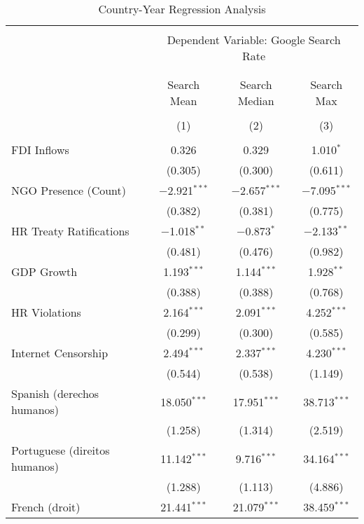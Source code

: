 
\begin{table}[!htbp] \centering 
  \caption{Country-Year Regression Analysis} 
  \label{} 
\begin{tabular}{@{\extracolsep{5pt}}lccc} 
\\[-1.8ex]\hline 
\hline \\[-1.8ex] 
 & \multicolumn{3}{c}{Dependent Variable: Google Search Rate} \\ 
\cline{2-4} 
\\[-1.8ex] & \multicolumn{3}{c}{ } \\ 
 & Search Mean & Search Median & Search Max \\ 
\\[-1.8ex] & (1) & (2) & (3)\\ 
\hline \\[-1.8ex] 
 FDI Inflows & 0.326 & 0.329 & 1.010$^{*}$ \\ 
  & (0.305) & (0.300) & (0.611) \\ 
  NGO Presence (Count) & $-$2.921$^{***}$ & $-$2.657$^{***}$ & $-$7.095$^{***}$ \\ 
  & (0.382) & (0.381) & (0.775) \\ 
  HR Treaty Ratifications & $-$1.018$^{**}$ & $-$0.873$^{*}$ & $-$2.133$^{**}$ \\ 
  & (0.481) & (0.476) & (0.982) \\ 
  GDP Growth & 1.193$^{***}$ & 1.144$^{***}$ & 1.928$^{**}$ \\ 
  & (0.388) & (0.388) & (0.768) \\ 
  HR Violations & 2.164$^{***}$ & 2.091$^{***}$ & 4.252$^{***}$ \\ 
  & (0.299) & (0.300) & (0.585) \\ 
  Internet Censorship & 2.494$^{***}$ & 2.337$^{***}$ & 4.230$^{***}$ \\ 
  & (0.544) & (0.538) & (1.149) \\ 
  Spanish (derechos humanos) & 18.050$^{***}$ & 17.951$^{***}$ & 38.713$^{***}$ \\ 
  & (1.258) & (1.314) & (2.519) \\ 
  Portuguese (direitos humanos) & 11.142$^{***}$ & 9.716$^{***}$ & 34.164$^{***}$ \\ 
  & (1.288) & (1.113) & (4.886) \\ 
  French (droit) & 21.441$^{***}$ & 21.079$^{***}$ & 38.459$^{***}$ \\ 

\end{tabular}
\end{table}
